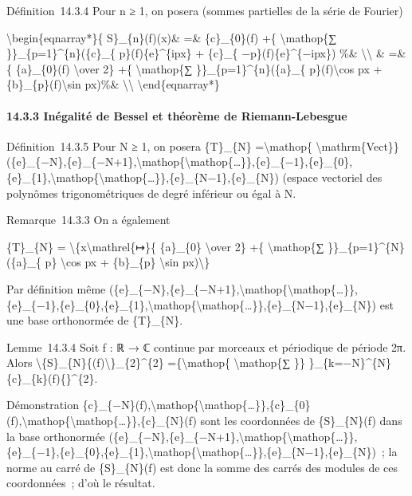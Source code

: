 \documentclass[]{article}
\begin{document}
Définition~14.3.4 Pour n ≥ 1, on posera (sommes partielles de la série
de Fourier)

\textbackslash{}begin\{eqnarray*\}\{ S\}\_\{n\}(f)(x)\& =\&
\{c\}\_\{0\}(f) +\{ \textbackslash{}mathop\{∑
\}\}\_\{p=1\}\^{}\{n\}(\{c\}\_\{ p\}(f)\{e\}\^{}\{ipx\} + \{c\}\_\{
−p\}(f)\{e\}\^{}\{−ipx\}) \%\& \textbackslash{}\textbackslash{} \& =\&\{
\{a\}\_\{0\}(f) \textbackslash{}over 2\} +\{ \textbackslash{}mathop\{∑
\}\}\_\{p=1\}\^{}\{n\}(\{a\}\_\{ p\}(f)\textbackslash{}cos px +
\{b\}\_\{p\}(f)\textbackslash{}sin px)\%\&
\textbackslash{}\textbackslash{} \textbackslash{}end\{eqnarray*\}

\paragraph{14.3.3 Inégalité de Bessel et théorème de Riemann-Lebesgue}

Définition~14.3.5 Pour N ≥ 1, on posera \{T\}\_\{N\}
=\textbackslash{}mathop\{
\textbackslash{}mathrm\{Vect\}\}(\{e\}\_\{−N\},\{e\}\_\{−N+1\},\textbackslash{}mathop\{\textbackslash{}mathop\{\ldots{}\}\},\{e\}\_\{−1\},\{e\}\_\{0\},\{e\}\_\{1\},\textbackslash{}mathop\{\textbackslash{}mathop\{\ldots{}\}\},\{e\}\_\{N−1\},\{e\}\_\{N\})
(espace vectoriel des polynômes trigonométriques de degré inférieur ou
égal à N.

Remarque~14.3.3 On a également

\{T\}\_\{N\} = \textbackslash{}\{x\textbackslash{}mathrel\{↦\}\{
\{a\}\_\{0\} \textbackslash{}over 2\} +\{ \textbackslash{}mathop\{∑
\}\}\_\{p=1\}\^{}\{N\}(\{a\}\_\{ p\} \textbackslash{}cos px +
\{b\}\_\{p\} \textbackslash{}sin px)\textbackslash{}\}

Par définition même
(\{e\}\_\{−N\},\{e\}\_\{−N+1\},\textbackslash{}mathop\{\textbackslash{}mathop\{\ldots{}\}\},\{e\}\_\{−1\},\{e\}\_\{0\},\{e\}\_\{1\},\textbackslash{}mathop\{\textbackslash{}mathop\{\ldots{}\}\},\{e\}\_\{N−1\},\{e\}\_\{N\})
est une base orthonormée de \{T\}\_\{N\}.

Lemme~14.3.4 Soit f : ℝ → ℂ continue par morceaux et périodique de
période 2π. Alors
\textbackslash{}\textbar{}\{S\}\_\{N\}\{(f)\textbackslash{}\textbar{}\}\_\{2\}\^{}\{2\}
=\{\textbackslash{}mathop\{ \textbackslash{}mathop\{∑ \}\}
\}\_\{k=−N\}\^{}\{N\}\textbar{}\{c\}\_\{k\}(f)\{\textbar{}\}\^{}\{2\}.

Démonstration
\{c\}\_\{−N\}(f),\textbackslash{}mathop\{\textbackslash{}mathop\{\ldots{}\}\},\{c\}\_\{0\}(f),\textbackslash{}mathop\{\textbackslash{}mathop\{\ldots{}\}\},\{c\}\_\{N\}(f)
sont les coordonnées de \{S\}\_\{N\}(f) dans la base orthonormée
(\{e\}\_\{−N\},\{e\}\_\{−N+1\},\textbackslash{}mathop\{\textbackslash{}mathop\{\ldots{}\}\},\{e\}\_\{−1\},\{e\}\_\{0\},\{e\}\_\{1\},\textbackslash{}mathop\{\textbackslash{}mathop\{\ldots{}\}\},\{e\}\_\{N−1\},\{e\}\_\{N\})~;
la norme au carré de \{S\}\_\{N\}(f) est donc la somme des carrés des
modules de ces coordonnées~; d'où le résultat.
\end{document}
